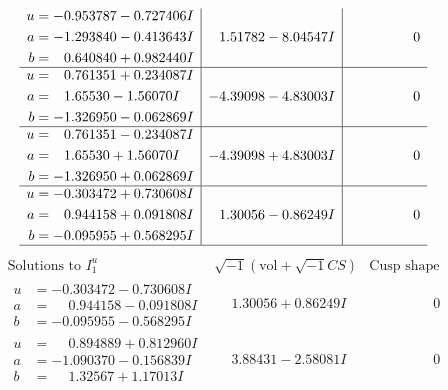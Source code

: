 \documentclass[1p]{elsarticle_modified}
\theoremstyle{definition}
\newcommand{\I}{\sqrt{-1}}
\begin{document}
$$\begin{array}{c|c|c}
\begin{aligned}
u &= -0.953787 - 0.727406 I \\
a &= -1.293840 - 0.413643 I \\
b &= \phantom{-}0.640840 + 0.982440 I\end{aligned}
 & \phantom{-}1.51782 - 8.04547 I & \phantom{-0.000000 } 0 \\ \hline\begin{aligned}
u &= \phantom{-}0.761351 + 0.234087 I \\
a &= \phantom{-}1.65530 - 1.56070 I \\
b &= -1.326950 - 0.062869 I\end{aligned}
 & -4.39098 - 4.83003 I & \phantom{-0.000000 } 0 \\ \hline\begin{aligned}
u &= \phantom{-}0.761351 - 0.234087 I \\
a &= \phantom{-}1.65530 + 1.56070 I \\
b &= -1.326950 + 0.062869 I\end{aligned}
 & -4.39098 + 4.83003 I & \phantom{-0.000000 } 0 \\ \hline\begin{aligned}
u &= -0.303472 + 0.730608 I \\
a &= \phantom{-}0.944158 + 0.091808 I \\
b &= -0.095955 + 0.568295 I\end{aligned}
 & \phantom{-}1.30056 - 0.86249 I & \phantom{-0.000000 } 0\\
 \hline 
 \end{array}$$\newpage$$\begin{array}{c|c|c}  
\text{Solutions to }I^u_{1}& \I (\text{vol} + \sqrt{-1}CS) & \text{Cusp shape}\\
 \hline 
\begin{aligned}
u &= -0.303472 - 0.730608 I \\
a &= \phantom{-}0.944158 - 0.091808 I \\
b &= -0.095955 - 0.568295 I\end{aligned}
 & \phantom{-}1.30056 + 0.86249 I & \phantom{-0.000000 } 0 \\ \hline\begin{aligned}
u &= \phantom{-}0.894889 + 0.812960 I \\
a &= -1.090370 - 0.156839 I \\
b &= \phantom{-}1.32567 + 1.17013 I\end{aligned}
 & \phantom{-}3.88431 - 2.58081 I & \phantom{-0.000000 } 0 \\ \hline\begin{aligned}

\end{aligned}
\end{array}$$
\end{document}
